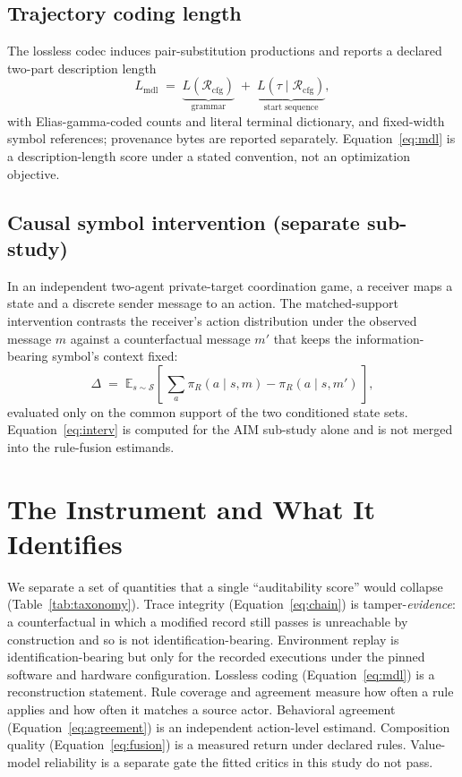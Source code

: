 \documentclass[11pt]{article}
\newcommand{\Rules}{\mathcal{R}}
\newcommand{\E}{\mathbb{E}}
\begin{document}
\subsection{Trajectory coding length}
The lossless codec induces pair-substitution productions and reports a declared two-part
description length
\begin{equation}
L_{\mathrm{mdl}} \;=\; \underbrace{L(\Rules_{\mathrm{cfg}})}_{\text{grammar}} \;+\;
\underbrace{L(\tau\mid \Rules_{\mathrm{cfg}})}_{\text{start sequence}},
\label{eq:mdl}
\end{equation}
with Elias-gamma-coded counts and literal terminal dictionary, and fixed-width symbol references;
provenance bytes are reported separately. Equation~\eqref{eq:mdl} is a description-length score
under a stated convention, not an optimization objective.

\subsection{Causal symbol intervention (separate sub-study)}
\label{sec:aim}
In an independent two-agent private-target coordination game, a receiver maps a state and a
discrete sender message to an action. The matched-support intervention contrasts the receiver's
action distribution under the observed message $m$ against a counterfactual message $m'$ that
keeps the information-bearing symbol's context fixed:
\begin{equation}
\Delta \;=\; \E_{s\sim\mathcal{S}}\!\left[\,\sum_{a}\pi_R(a\mid s,m) - \pi_R(a\mid s,m')\,\right],
\label{eq:interv}
\end{equation}
evaluated only on the common support of the two conditioned state sets. Equation~\eqref{eq:interv}
is computed for the AIM sub-study alone and is not merged into the rule-fusion estimands.

\section{The Instrument and What It Identifies}
\label{sec:instrument}

We separate a set of quantities that a single ``auditability score'' would collapse
(Table~\ref{tab:taxonomy}). Trace integrity (Equation~\eqref{eq:chain}) is tamper-\emph{evidence}:
a counterfactual in which a modified record still passes is unreachable by construction and so is
not identification-bearing. Environment replay is identification-bearing but only for the recorded
executions under the pinned software and hardware configuration. Lossless coding
(Equation~\eqref{eq:mdl}) is a reconstruction statement. Rule coverage and agreement measure how
often a rule applies and how often it matches a source actor. Behavioral agreement
(Equation~\eqref{eq:agreement}) is an independent action-level estimand. Composition quality
(Equation~\eqref{eq:fusion}) is a measured return under declared rules. Value-model reliability is
a separate gate the fitted critics in this study do not pass.
\end{document}
